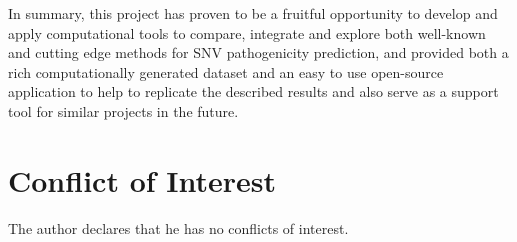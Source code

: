\documentclass[12pt,MSc,wordcount,anon]{muthesis}
\begin{document}
\begin{flushleft}
In summary, this project has proven to be a fruitful opportunity to develop and apply computational tools to compare, integrate and explore both well-known and cutting edge methods for SNV pathogenicity prediction, and provided both a rich computationally generated dataset and an easy to use open-source application to help to replicate the described results and also serve as a support tool for similar projects in the future.

\section{Conflict of Interest}
The author declares that he has no conflicts of interest.


\nocite{*}


\end{flushleft}
\end{document}
